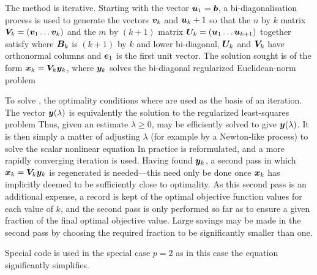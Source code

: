 \documentclass{galahad}
\begin{document}
\noindent
The method is iterative. Starting  with the vector ${\bm{u}}_1 = {\bm{b}}$, a
bi-diagonalisation process is used to generate the vectors ${\bm{v}}_k$ and
${\bm{u}}_k+1$ so that the $n$ by $k$ matrix ${\bm{V}}_k = ( {\bm{v}}_1 \ldots {\bm{v}}_k)$
and the $m$ by $(k+1)$ matrix ${\bm{U}}_k = ( {\bm{u}}_1 \ldots {\bm{u}}_{k+1})$
together satisfy
where ${\bm{B}}_k$ is $(k+1)$ by $k$ and lower bi-diagonal, ${\bm{U}}_k$ and
${\bm{V}}_k$ have orthonormal columns and ${\bm{e}}_1$ is the first unit vector.
The solution sought is of the form ${\bm{x}}_k = {\bm{V}}_k {\bm{y}}_k$, where ${\bm{y}}_k$
solves the bi-diagonal regularized Euclidean-norm problem

To solve , the optimality conditions
where
are used as the basis of an iteration.
The vector ${\bm{y}}(\lambda)$ is equivalently the solution to the
regularized least-squares problem
Thus, given an estimate $\lambda \geq 0$,  may be efficiently
solved to give ${\bm{y}}(\lambda)$.
It is then simply a matter of adjusting $\lambda$
(for example by a Newton-like process) to solve the scalar nonlinear equation
In practice  is reformulated, and a more rapidly converging iteration is
used. Having found  ${\bm{y}}_k$, a second pass in which
${\bm{x}}_k = {\bm{V}}_k {\bm{y}}_k$ is regenerated is needed---this need only be done
once ${\bm{x}}_k$ has implicitly deemed to be sufficiently close to optimality.
As this second pass is an additional expense, a record is kept of the
optimal objective function values for each value of $k$, and the second
pass is only performed so far as to ensure a given fraction of the
final optimal objective value. Large savings may be made in the second
pass by choosing the required fraction to be significantly smaller than one.

Special code is used in the special case $p=2$ as in this case the
equation  significantly simplifies.
\end{document}
